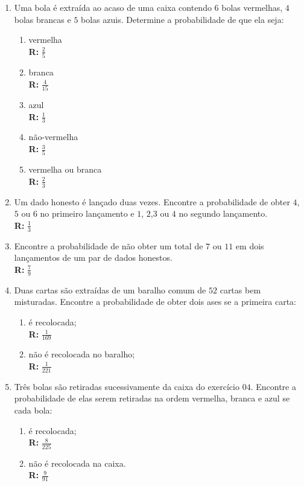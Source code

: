 \documentclass[oneside,a4paper,12pt]{article}
\begin{document}
\begin{enumerate}
	\item Uma bola é extraída ao acaso de uma caixa contendo $6$ bolas vermelhas, $4$ bolas brancas e $5$ bolas azuis. Determine a probabilidade de que ela seja:
	\begin{enumerate}
		\item vermelha \\ {\bf R: } $\frac{2}{5}$
		\item branca \\ {\bf R: } $\frac{4}{15}$
		\item azul \\ {\bf R: } $\frac{1}{3}$
		\item não-vermelha \\ {\bf R: } $\frac{3}{5}$
		\item vermelha ou branca \\ {\bf R: } $\frac{2}{3}$
	\end{enumerate}

	\item Um dado honesto é lançado duas vezes. Encontre a probabilidade de obter $4$, $5$ ou $6$ no primeiro lançamento e $1$, $2$,$3$ ou $4$ no segundo lançamento. \\ {\bf R: } $\frac{1}{3}$

	\item Encontre a probabilidade de não obter um total de $7$ ou $11$ em dois lançamentos de um par de dados honestos. \\ {\bf R: } $\frac{7}{9}$
	
	\item Duas cartas são extraídas de um baralho comum de $52$ cartas bem misturadas. Encontre a probabilidade de obter dois ases se a primeira carta:
	\begin{enumerate}
		\item é recolocada; \\ {\bf R: } $\frac{1}{169}$
		\item não é recolocada no baralho; \\ {\bf R: } $\frac{1}{221}$
	\end{enumerate}

	\item Três bolas são retiradas sucessivamente da caixa do exercício $04$. Encontre a probabilidade de elas serem retiradas na ordem vermelha, branca e azul se cada bola:
	\begin{enumerate}
		\item é recolocada; \\ {\bf R: } $\frac{8}{225}$
		\item não é recolocada na caixa. \\ {\bf R: } $\frac{9}{91}$
	\end{enumerate}


\end{enumerate}
\end{document}

